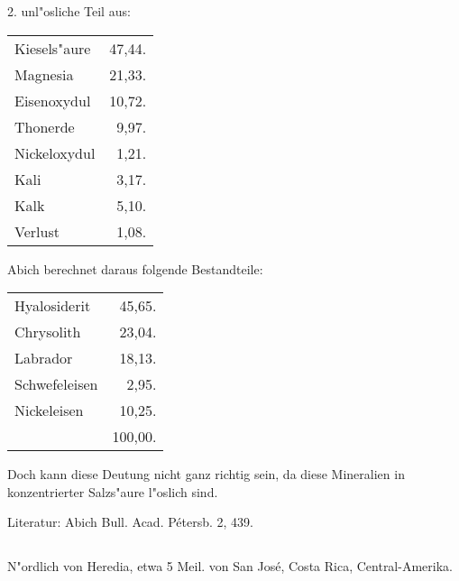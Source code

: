 \documentclass[a4paper, 11pt, oneside]{article}
\begin{document}
\begin{center}
2. unl"osliche Teil aus:
\end{center}

\begin{table}[H]
    \centering\swabfamily\Large
    \begin{tabular}{l r}
    \hline
        Kiesels"aure & 47,44. \\
        Magnesia & 21,33. \\
        Eisenoxydul & 10,72. \\
        Thonerde & 9,97. \\
        Nickeloxydul & 1,21. \\
        Kali & 3,17. \\
        Kalk & 5,10. \\
        Verlust & 1,08. \\
    \end{tabular}
\end{table}

\begin{center}
Abich berechnet daraus folgende Bestandteile:
\end{center}

\begin{table}[H]
    \centering\swabfamily\Large
    \begin{tabular}{l r}
    \hline
        Hyalosiderit & 45,65. \\
        Chrysolith & 23,04. \\
        Labrador & 18,13. \\
        Schwefeleisen & 2,95. \\
        Nickeleisen & 10,25. \\
         & 100,00. \\
    \end{tabular}
\end{table}

Doch kann diese Deutung nicht ganz richtig sein, da diese Mineralien in konzentrierter Salzs"aure l"oslich sind.

\normalsize
Literatur: Abich Bull. Acad. Pétersb. 2, 439.

\subsection{}
\LARGE
\paragraph{}
N"ordlich von Heredia, etwa 5 Meil. von San José, Costa Rica, Central-Amerika.
\end{document}
